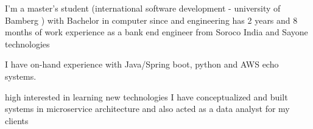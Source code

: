 %
%
%
\par{
    I'm a master's student (international software development - university of Bamberg ) with Bachelor in computer since and engineering has 2 years and 8 months of work experience as a bank end engineer from Soroco India and Sayone technologies 

    I have on-hand experience with Java/Spring boot, python and AWS echo systems.
    
    high interested in learning new technologies I have conceptualized and built systems in microservice architecture and also acted as a data analyst for my clients 
}